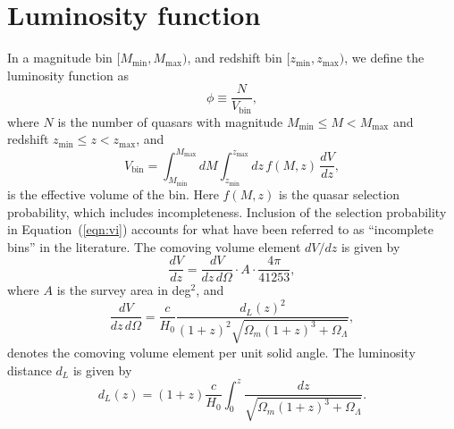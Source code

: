 \documentclass[a4paper,fleqn,usenatbib]{mnras}
\begin{document}


\section{Luminosity function}

In a magnitude bin $[M_\mathrm{min}, M_\mathrm{max})$, and redshift
  bin $[z_\mathrm{min}, z_\mathrm{max})$, we define the luminosity
    function as \citep{2000MNRAS.311..433P}
  \begin{equation}
    \phi \equiv \frac{N}{V_\mathrm{bin}},
  \end{equation}
  where $N$ is the number of quasars with magnitude
  $M_\mathrm{min}\leq M<M_\mathrm{max}$ and redshift
  $z_\mathrm{min}\leq z<z_\mathrm{max}$, and
  \begin{equation}
    V_\mathrm{bin} = \int_{M_\mathrm{min}}^{M_\mathrm{max}}dM\int_{z_\mathrm{min}}^{z_\mathrm{max}}dz\, f(M, z)\,\frac{dV}{dz},
    \label{eqn:vi}
  \end{equation}
  is the effective volume of the bin.  Here $f(M,z)$ is the quasar
  selection probability, which includes incompleteness.  Inclusion of
  the selection probability in Equation~(\ref{eqn:vi}) accounts for
  what have been referred to as ``incomplete bins'' in the literature.
  The comoving volume element $dV/dz$ is given by
  \begin{equation}
    \frac{dV}{dz}=\frac{dV}{dz\,d\Omega}\cdot A\cdot\frac{4\pi}{41253},
  \end{equation}
  where $A$ is the survey area in deg$^2$, and \citep{1999astro.ph..5116H}
  \begin{equation}
    \frac{dV}{dz\,d\Omega}=\frac{c}{H_0}\frac{d_L(z)^2}{(1+z)^2\sqrt{\Omega_m(1+z)^3+\Omega_\Lambda}},
    \label{eqn:dvdzdo}
  \end{equation}
  denotes the comoving volume element per unit solid angle.  The
  luminosity distance $d_L$ is given by
  \begin{equation}
    d_L(z)=(1+z)\frac{c}{H_0}\int_0^z\frac{dz}{\sqrt{\Omega_m(1+z)^3+\Omega_\Lambda}}.
    \label{eqn:dl}
  \end{equation}
\end{document}

